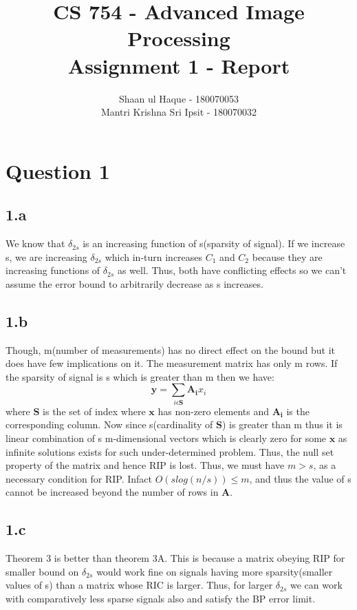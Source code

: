 \documentclass[12pt]{article}
\title{CS 754 - Advanced Image Processing\\Assignment 1 - Report}
\author{Shaan ul Haque - 180070053\\Mantri Krishna Sri Ipsit - 180070032}
\begin{document}
\maketitle

\section*{Question 1}
\subsection*{1.a}
We know that $\delta_{2s}$ is an increasing function of s(sparsity of signal). If we increase s, we are increasing $\delta_{2s}$ which in-turn increases $C_1$ and $C_2$ because they are increasing functions of $\delta_{2s}$ as well. Thus, both have conflicting effects so we can't assume the error bound to arbitrarily decrease as s increases. 
\subsection*{1.b}
Though, m(number of measurements) has no direct effect on the bound but it does have few implications on it. The measurement matrix has only m rows. If the sparsity of signal is s which is greater than m then we have:
\begin{equation*}
    \boldsymbol{y} = \sum_{i\epsilon\boldsymbol{S}}\boldsymbol{A_i}x_i
\end{equation*}
where $\boldsymbol{S}$ is the set of index where $\boldsymbol{x}$ has non-zero elements and $\boldsymbol{A_i}$ is the corresponding column. Now since s(cardinality of $\boldsymbol{S}$) is greater than m thus it is linear combination of s m-dimensional vectors which is clearly zero for some $\boldsymbol{x}$ as infinite solutions exists for such under-determined problem. Thus, the null set property of the matrix and hence RIP is lost. Thus, we must have $m>s$, as a necessary condition for RIP. Infact $O(slog(n/s))\leq m$, and thus the value of s cannot be increased beyond the number of rows in $\boldsymbol{A}$.
\subsection*{1.c}
Theorem 3 is better than theorem 3A. This is because a matrix obeying RIP for smaller bound on $\delta_{2s}$ would work fine on signals having more sparsity(smaller values of s) than a matrix whose RIC is larger. Thus, for larger $\delta_{2s}$ we can work with comparatively less sparse signals also and satisfy the BP error limit.
\end{document}

